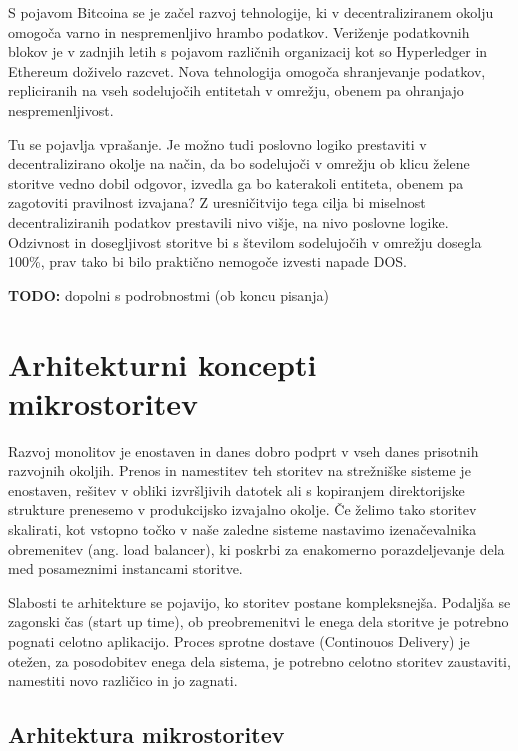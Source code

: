 \documentclass[a4paper, 12pt]{book}
\begin{document}
S pojavom Bitcoina se je začel razvoj tehnologije, ki v decentraliziranem okolju omogoča varno in nespremenljivo hrambo podatkov.
Veriženje podatkovnih blokov je v zadnjih letih s pojavom različnih organizacij kot so Hyperledger in Ethereum doživelo razcvet.
Nova tehnologija omogoča shranjevanje podatkov, repliciranih na vseh sodelujočih entitetah v omrežju, obenem pa ohranjajo nespremenljivost.

Tu se pojavlja vprašanje. 
Je možno tudi poslovno logiko prestaviti v decentralizirano okolje na način, da bo sodelujoči v omrežju ob klicu želene storitve vedno dobil odgovor, izvedla ga bo katerakoli entiteta, obenem pa zagotoviti pravilnost izvajana?
Z uresničitvijo tega cilja bi miselnost decentraliziranih podatkov prestavili nivo višje, na nivo poslovne logike.
Odzivnost in dosegljivost storitve bi s številom sodelujočih v omrežju dosegla 100\%, prav tako bi bilo praktično nemogoče izvesti napade DOS.

\textbf{TODO:} dopolni s podrobnostmi (ob koncu pisanja)


\chapter{Arhitekturni koncepti mikrostoritev}
\label{ch1}

Razvoj monolitov je enostaven in danes dobro podprt v vseh danes prisotnih razvojnih okoljih.
Prenos in namestitev teh storitev na strežniške sisteme je enostaven, rešitev v obliki izvršljivih datotek ali s kopiranjem direktorijske strukture prenesemo v produkcijsko izvajalno okolje.
Če želimo tako storitev skalirati, kot vstopno točko v naše zaledne sisteme nastavimo izenačevalnika obremenitev (ang. load balancer), ki poskrbi za enakomerno porazdeljevanje dela med posameznimi instancami storitve.

Slabosti te arhitekture se pojavijo, ko storitev postane kompleksnejša.
Podaljša se zagonski čas (start up time), ob preobremenitvi le enega dela storitve je potrebno pognati celotno aplikacijo.
Proces sprotne dostave (Continouos Delivery) je otežen, za posodobitev enega dela sistema, je potrebno celotno storitev zaustaviti, namestiti novo različico in jo zagnati. \cite{monolithMicroservice}


\section{Arhitektura mikrostoritev}
\end{document}
